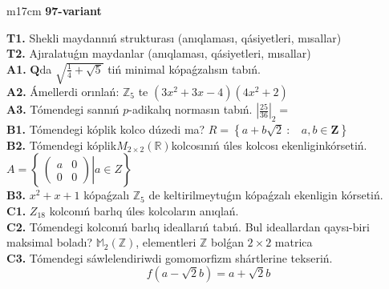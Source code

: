 \documentclass{article}
\begin{document}
\begin{tabular}{m{17cm}}
\textbf{97-variant}
\newline

\textbf{T1.} Shekli maydannıń strukturası (anıqlaması, qásiyetleri, mısallar) \\
\textbf{T2.} Ajıralatuǵın maydanlar (anıqlaması, qásiyetleri, mısallar) \\
\textbf{A1.} \(\mathbf{Q}\)da \(\sqrt{\frac{1}{4} + \sqrt{5}}\) tiń minimal kópaǵzalısın tabıń. \\
\textbf{A2.} Ámellerdi orınlań: \(\mathbb{Z}_{5}\) te \(\left( 3x^{2} + 3x - 4 \right)\left( 4x^{2} + 2 \right)\) \\
\textbf{A3.} Tómendegi sannıń \(p\)-adikalıq normasın tabıń. \(|\frac{25}{36}|_{2} =\) \\
\textbf{B1.} Tómendegi kóplik kolco dúzedi ma? \(R = \left\{ a + b\sqrt{2}\ :\ \ \ \ a,b \in \mathbf{Z} \right\}\) \\
\textbf{B2.} Tómendegi kóplik\(M_{2 \times 2}\left( \mathbb{R} \right)\)kolcosınıń úles kolcosı ekenliginkórsetiń. \(A = \left\{ \left. \ \begin{pmatrix}
a & 0 \\
0 & 0
\end{pmatrix} \right|a \in Z \right\}\) \\
\textbf{B3.} \(x^{2} + x + 1\) kópaǵzalı \(\mathbb{Z}_{5}\) de keltirilmeytuǵın kópaǵzalı ekenligin kórsetiń. \\
\textbf{C1.} \(Z_{18}\) kolconıń barlıq úles kolcoların anıqlań. \\
\textbf{C2.} Tómendegi kolconıń barlıq ideallarıń tabıń. Bul ideallardan qaysı-biri maksimal boladı? \(\mathbb{M}_{2}\left( \mathbb{Z} \right)\), elementleri \(\mathbb{Z}\) bolǵan \(2 \times 2\) matrica \\
\textbf{C3.} Tómendegi sáwlelendiriwdi gomomorfizm shártlerine tekseriń.
\[f\left( a - \sqrt{2}b \right) = a + \sqrt{2}b\] \\

\end{tabular}
\vspace{1cm}
\end{document}
